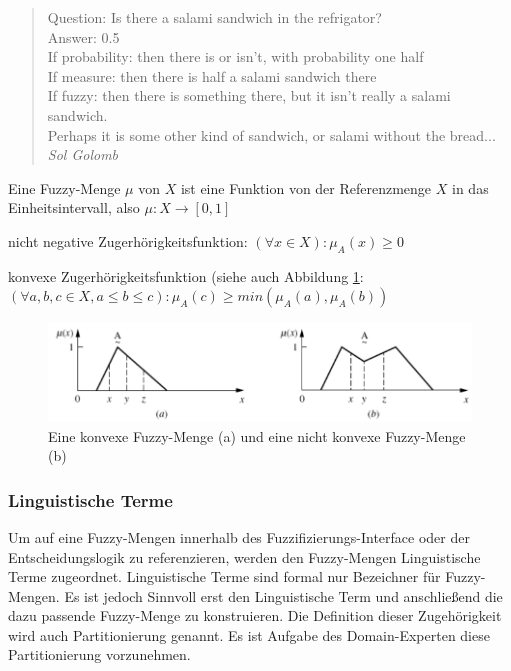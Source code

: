 \documentclass[12pt,a4paper,bibliography=totocnumbered,listof=totocnumbered]{scrartcl}
\theoremstyle{Umgebung}
\begin{document}
\begin{quote}
Question: Is there a salami sandwich in the refrigator? \\
Answer: 0.5 \\
If probability: then there is or isn’t, with probability one half \\
If measure: then there is half a salami sandwich there \\
If fuzzy: then there is something there, but it isn’t really a salami sandwich. \\
Perhaps it is some other kind of sandwich, or salami without the bread... \\
\emph{Sol Golomb}
\end{quote}

\begin{defnt}
Eine Fuzzy-Menge $\mu$ von $X$ ist eine Funktion von der Referenzmenge
$X$ in das Einheitsintervall, also $\mu : X \rightarrow \left [0,1\right]$
\end{defnt}


\begin{defnt}
	nicht negative Zugerhörigkeitsfunktion:
	$(\forall x \in X): \mu_A(x) \geq 0 $
\end{defnt}


\begin{defnt}
	konvexe Zugerhörigkeitsfunktion (siehe auch Abbildung \ref{fig:convex}:
	$(\forall a,b,c \in X, a \le b \le c): \mu_A(c) \geq min(\mu_A(a), \mu_A(b)) $
\end{defnt}

\begin{figure}
	\centering
	\includegraphics[width=0.7\linewidth]{img/convex}
	\caption{Eine konvexe Fuzzy-Menge (a) und eine nicht konvexe Fuzzy-Menge (b)}
	\label{fig:convex}
\end{figure}


\subsubsection{Linguistische Terme}

Um auf eine Fuzzy-Mengen innerhalb des Fuzzifizierungs-Interface oder der Entscheidungslogik zu referenzieren, werden den Fuzzy-Mengen Linguistische Terme zugeordnet. Linguistische Terme sind formal nur Bezeichner für Fuzzy-Mengen. Es ist jedoch Sinnvoll erst den Linguistische Term und anschließend die dazu passende Fuzzy-Menge zu konstruieren. Die Definition dieser Zugehörigkeit wird auch Partitionierung genannt. Es ist Aufgabe des Domain-Experten diese Partitionierung vorzunehmen.
\end{document}
